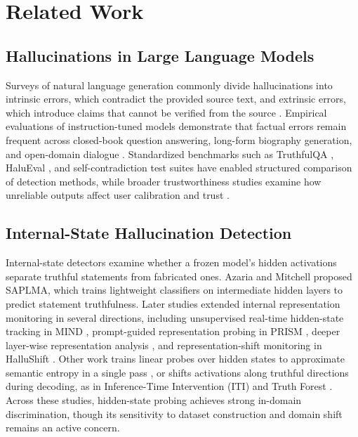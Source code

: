 \documentclass{ieeeaccess}
\begin{document}
\section{Related Work}
\label{sec:related}

\subsection{Hallucinations in Large Language Models}
Surveys of natural language generation commonly divide hallucinations into intrinsic errors, which contradict the provided source text, and extrinsic errors, which introduce claims that cannot be verified from the source \cite{review35,review18}. Empirical evaluations of instruction-tuned models demonstrate that factual errors remain frequent across closed-book question answering, long-form biography generation, and open-domain dialogue \cite{review37,review23}. Standardized benchmarks such as TruthfulQA \cite{review22}, HaluEval \cite{review29}, and self-contradiction test suites \cite{review36} have enabled structured comparison of detection methods, while broader trustworthiness studies examine how unreliable outputs affect user calibration and trust \cite{review03,review19}.

\subsection{Internal-State Hallucination Detection}
Internal-state detectors examine whether a frozen model's hidden activations separate truthful statements from fabricated ones. Azaria and Mitchell \cite{review27} proposed SAPLMA, which trains lightweight classifiers on intermediate hidden layers to predict statement truthfulness. Later studies extended internal representation monitoring in several directions, including unsupervised real-time hidden-state tracking in MIND \cite{review01}, prompt-guided representation probing in PRISM \cite{review02}, deeper layer-wise representation analysis \cite{review05}, and representation-shift monitoring in HalluShift \cite{review13}. Other work trains linear probes over hidden states to approximate semantic entropy in a single pass \cite{review14}, or shifts activations along truthful directions during decoding, as in Inference-Time Intervention (ITI) \cite{review28} and Truth Forest \cite{review38}. Across these studies, hidden-state probing achieves strong in-domain discrimination, though its sensitivity to dataset construction and domain shift remains an active concern.
\end{document}
